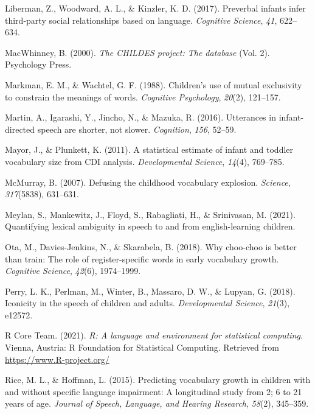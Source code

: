 \documentclass[10pt, letterpaper]{article}
\newenvironment{CSLReferences}%
  {}%
  {\par}
\begin{document}
\begin{CSLReferences}{1}{0}
\leavevmode\hypertarget{ref-liberman2017preverbal}{}%
Liberman, Z., Woodward, A. L., \& Kinzler, K. D. (2017). Preverbal
infants infer third-party social relationships based on language.
\emph{Cognitive Science}, \emph{41}, 622--634.

\leavevmode\hypertarget{ref-macwhinney2000childes}{}%
MacWhinney, B. (2000). \emph{The CHILDES project: The database} (Vol.
2). Psychology Press.

\leavevmode\hypertarget{ref-markman1988children}{}%
Markman, E. M., \& Wachtel, G. F. (1988). Children's use of mutual
exclusivity to constrain the meanings of words. \emph{Cognitive
Psychology}, \emph{20}(2), 121--157.

\leavevmode\hypertarget{ref-martin2016utterances}{}%
Martin, A., Igarashi, Y., Jincho, N., \& Mazuka, R. (2016). Utterances
in infant-directed speech are shorter, not slower. \emph{Cognition},
\emph{156}, 52--59.

\leavevmode\hypertarget{ref-mayor2011statistical}{}%
Mayor, J., \& Plunkett, K. (2011). A statistical estimate of infant and
toddler vocabulary size from CDI analysis. \emph{Developmental Science},
\emph{14}(4), 769--785.

\leavevmode\hypertarget{ref-mcmurray2007defusing}{}%
McMurray, B. (2007). Defusing the childhood vocabulary explosion.
\emph{Science}, \emph{317}(5838), 631--631.

\leavevmode\hypertarget{ref-meylan2021quantifying}{}%
Meylan, S., Mankewitz, J., Floyd, S., Rabagliati, H., \& Srinivasan, M.
(2021). Quantifying lexical ambiguity in speech to and from
english-learning children.

\leavevmode\hypertarget{ref-ota2018choo}{}%
Ota, M., Davies-Jenkins, N., \& Skarabela, B. (2018). Why choo-choo is
better than train: The role of register-specific words in early
vocabulary growth. \emph{Cognitive Science}, \emph{42}(6), 1974--1999.

\leavevmode\hypertarget{ref-perry2018iconicity}{}%
Perry, L. K., Perlman, M., Winter, B., Massaro, D. W., \& Lupyan, G.
(2018). Iconicity in the speech of children and adults.
\emph{Developmental Science}, \emph{21}(3), e12572.

\leavevmode\hypertarget{ref-r2021}{}%
R Core Team. (2021). \emph{R: A language and environment for statistical
computing}. Vienna, Austria: R Foundation for Statistical Computing.
Retrieved from \url{https://www.R-project.org/}

\leavevmode\hypertarget{ref-rice2015predicting}{}%
Rice, M. L., \& Hoffman, L. (2015). Predicting vocabulary growth in
children with and without specific language impairment: A longitudinal
study from 2; 6 to 21 years of age. \emph{Journal of Speech, Language,
and Hearing Research}, \emph{58}(2), 345--359.


\end{CSLReferences}
\end{document}
